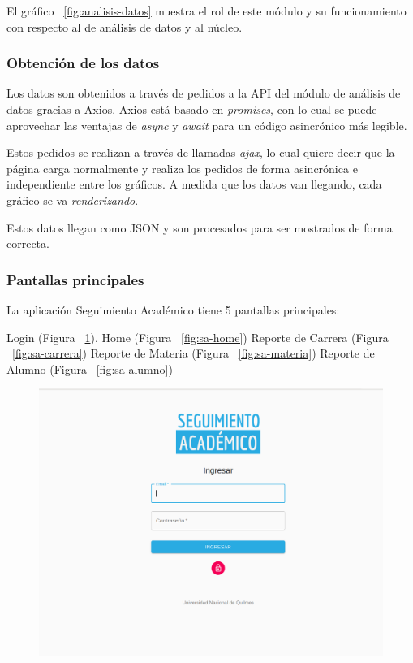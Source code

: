 El gráfico ~\ref{fig:analisis-datos} muestra el rol de este módulo y su funcionamiento con respecto al de análisis de datos y al núcleo.

\subsubsection{Obtención de los datos}

Los datos son obtenidos a través de pedidos a la API del módulo de análisis de datos gracias a Axios.
Axios está basado en \textit{promises}, con lo cual se puede aprovechar las ventajas de \textit{async} y \textit{await} para un código asincrónico más legible.

Estos pedidos se realizan a través de llamadas \textit{ajax}, lo cual quiere decir que la página carga normalmente y realiza los pedidos de forma asincrónica e independiente entre los gráficos. A medida que los datos van llegando, cada gráfico se va \textit{renderizando}.

Estos datos llegan como JSON y son procesados para ser mostrados de forma correcta.


\subsubsection{Pantallas principales}

La aplicación Seguimiento Académico tiene 5 pantallas principales:
\begin{outline}
 \1 Login (Figura ~\ref{fig:sa-login}).
 \1 Home (Figura ~\ref{fig:sa-home})
 \1 Reporte de Carrera (Figura ~\ref{fig:sa-carrera})
 \1 Reporte de Materia (Figura ~\ref{fig:sa-materia})
 \1 Reporte de Alumno (Figura ~\ref{fig:sa-alumno})
\end{outline}


\begin{figure}[!htbp]
  \centering
    \includegraphics[scale=0.3]{images/seguimiento-academico/sa-login.png}
  \label{fig:sa-login}
\end{figure}


